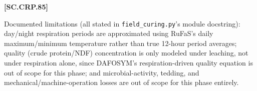             {\raggedleft \textbf{[SC.CRP.85]}\par}
            \vspace{0.5cm}

Documented limitations (all stated in \texttt{field\_curing.py}'s module docstring): day/night respiration periods are approximated using RuFaS's daily maximum/minimum temperature rather than true 12-hour period averages; quality (crude protein/NDF) concentration is only modeled under leaching, not under respiration alone, since DAFOSYM's respiration-driven quality equation is out of scope for this phase; and microbial-activity, tedding, and mechanical/machine-operation losses are out of scope for this phase entirely.

\begin{refsection}
\label{sec:references-crop-and-soil-module}
\printbibliography[heading=subbibliography,title={References for Crop and Soil Module}]
\end{refsection}

